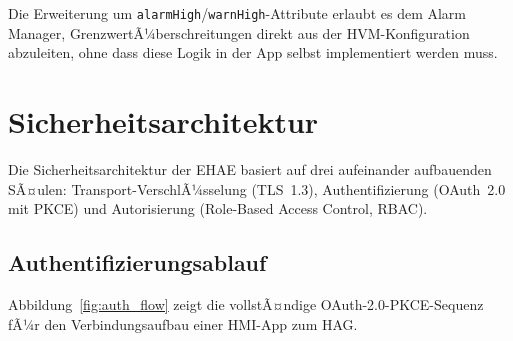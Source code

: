 ﻿\documentclass[12pt,a4paper]{article}
\begin{document}
Die Erweiterung um \texttt{alarmHigh}/\texttt{warnHigh}-Attribute erlaubt es dem Alarm
Manager, GrenzwertÃ¼berschreitungen direkt aus der HVM-Konfiguration abzuleiten, ohne
dass diese Logik in der App selbst implementiert werden muss.

\section{Sicherheitsarchitektur}
\label{sec:security}

Die Sicherheitsarchitektur der EHAE basiert auf drei aufeinander aufbauenden SÃ¤ulen:
Transport-VerschlÃ¼sselung (TLS~1.3), Authentifizierung (OAuth~2.0 mit PKCE) und
Autorisierung (Role-Based Access Control, RBAC).

\subsection{Authentifizierungsablauf}

Abbildung~\ref{fig:auth_flow} zeigt die vollstÃ¤ndige OAuth-2.0-PKCE-Sequenz fÃ¼r den
Verbindungsaufbau einer HMI-App zum HAG.
\end{document}
